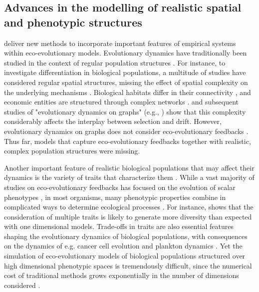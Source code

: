 \subsection{Advances in the modelling of realistic spatial and phenotypic structures}

\Cref{\chapi,\chapiv} deliver new methods to incorporate important features of empirical systems within eco-evolutionary models.
% 
Evolutionary dynamics have traditionally been studied in the context of regular population structures \citep{LiebermanHauert2005}.
% 
For instance, to investigate differentiation in biological populations, a multitude of studies have considered regular spatial structures, missing the effect of spatial complexity on the underlying mechanisms \citep{Slatkin1973,Slatkin1978,Kirkpatrick1997,Polechova2015,Polechova2018,AndradeRestrepo2019,Doebeli2003,Meszena1997,Yeaman2011,Debarre2013,Mirrahimi2020}.
% 
Biological habitats differ in their connectivity \citep{Dale2010}, and economic entities are structured through complex networks \citep{Schweitzer2009}. \cite{LiebermanHauert2005} and subsequent studies of "evolutionary dynamics on graphs" (e.g., \cite{Tkadlec2019}) show that this complexity considerably affects the interplay between selection and drift. However, evolutionary dynamics on graphs does not consider eco-evolutionary feedbacks \citep{Govaert2019}.
% 
Thus far, models that capture eco-evolutionary feedbacks together with realistic, complex population structures were missing.

Another important feature of realistic biological populations that may affect their dynamics is the variety of traits that characterize them \citep{Doebeli2011}. While a vast majority of studies on eco-evolutionary feedbacks has focused on the evolution of scalar phenotypes \citep{Doebeli2011}, in most organisms, many phenotypic properties combine in complicated ways to determine ecological processes \citep{Doebeli2014}.
% 
For instance, \cite{Doebeli2011} shows that the consideration of multiple traits is likely to generate more diversity than expected with one dimensional models.
% 
Trade-offs in traits are also essential features shaping the evolutionary dynamics of biological populations, with consequences on the dynamics of e.g. cancer cell evolution \citep{Fiandaca2021} and plankton dynamics \citep{LeGland2020}.
% 
Yet the simulation of eco-evolutionary models of biological populations structured over high dimensional phenotypic spaces is tremendously difficult, since the numerical cost of traditional methods grows exponentially in the number of dimensions considered \citep{Bellman1957}. 

